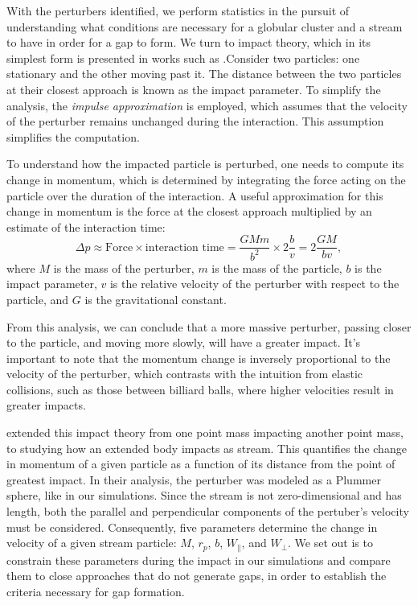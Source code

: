 \documentclass[draft]{aa}
\begin{document}
\begin{appendix}
      With the perturbers identified, we perform statistics in the pursuit of understanding what conditions are necessary for a globular cluster and a stream to have in order for a gap to form. We turn to impact theory, which in its simplest form is presented in works such as \citet{2008gady.book.....B}.Consider two particles: one stationary and the other moving past it. The distance between the two particles at their closest approach is known as the impact parameter. To simplify the analysis, the \textit{impulse approximation} is employed, which assumes that the velocity of the perturber remains unchanged during the interaction. This assumption simplifies the computation.

      To understand how the impacted particle is perturbed, one needs to compute its change in momentum, which is determined by integrating the force acting on the particle over the duration of the interaction. A useful approximation for this change in momentum is the force at the closest approach multiplied by an estimate of the interaction time:
      \begin{equation} 
        \Delta p \approx \text{Force} \times \text{interaction time} = \frac{GMm}{b^2} \times 2\frac{b}{v} = 2\frac{GM}{bv}, 
        \end{equation} 
      where $M$ is the mass of the perturber, $m$ is the mass of the particle, $b$ is the impact parameter, $v$ is the relative velocity of the perturber with respect to the particle, and $G$ is the gravitational constant.

      From this analysis, we can conclude that a more massive perturber, passing closer to the particle, and moving more slowly, will have a greater impact. It's important to note that the momentum change is inversely proportional to the velocity of the perturber, which contrasts with the intuition from elastic collisions, such as those between billiard balls, where higher velocities result in greater impacts.

      \citet{2015MNRAS.450.1136E} extended this impact theory from one point mass impacting another point mass, to studying how an extended body impacts as stream. This quantifies the change in momentum of a given particle as a function of its distance from the point of greatest impact. In their analysis, the perturber was modeled as a Plummer sphere, like in our simulations. Since the stream is not zero-dimensional and has length, both the parallel and perpendicular components of the pertuber's velocity must be considered. Consequently, five parameters determine the change in velocity of a given stream particle: $M$, $r_p$, $b$, $W_\parallel$, and $W_\perp$. We set out is to constrain these parameters during the impact in our simulations and compare them to close approaches that do not generate gaps, in order to establish the criteria necessary for gap formation.


\end{appendix}
\end{document}
